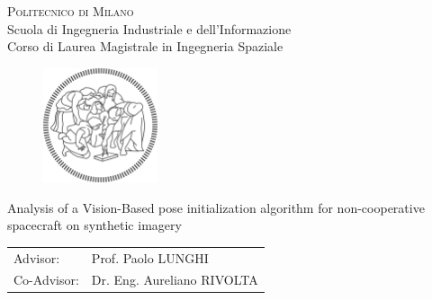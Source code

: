 \begin{titlepage}

\begin{center}
\Large{\textsc{Politecnico di Milano}}\\
\Large{Scuola di Ingegneria Industriale e dell'Informazione}\\
\large{Corso di Laurea Magistrale in Ingegneria Spaziale}\\
\par
\par
\end{center}

\vspace{0.5cm}

\begin{center}
\begin{figure}[h!]
\centering{}
\includegraphics[width=0.3\textwidth]{title-page/logo-polimi-new}
\end{figure}
\vspace{1cm}
\par
\end{center}

\begin{center}
\LARGE{Analysis of a Vision-Based pose initialization algorithm for non-cooperative spacecraft on synthetic imagery}
\vspace{2cm}
\par
\end{center}

\begin{flushleft}
\begin{tabular}{ll}
Advisor:  & Prof. Paolo LUNGHI\tabularnewline
Co-Advisor:  & Dr. Eng. Aureliano RIVOLTA\tabularnewline %
\end{tabular}\vspace{1cm}
\par
\end{flushleft}


\end{titlepage}
